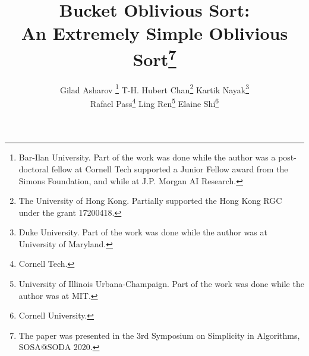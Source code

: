 \documentclass[11pt,letterpaper]{article}
\theoremstyle{boxes}
\begin{document}
\title{\bf Bucket Oblivious Sort: \\An Extremely Simple Oblivious Sort\thanks{The paper was presented in the 3rd Symposium on Simplicity in Algorithms, SOSA@SODA 2020.}}

\author{Gilad Asharov \thanks{Bar-Ilan University. Part of the work was done while the author was a post-doctoral fellow at Cornell Tech supported a Junior Fellow award from the Simons Foundation, and while at J.P. Morgan AI Research.} \qquad
T-H. Hubert Chan\thanks{The University of Hong Kong. Partially supported the Hong Kong RGC under the grant 17200418.} \qquad
Kartik Nayak\thanks{Duke University. Part of the work was done while the author was at University of Maryland.} \\
Rafael Pass\thanks{Cornell Tech.} \qquad
Ling Ren\thanks{University of Illinois Urbana-Champaign. Part of the work was done while the author was at MIT.} \qquad
Elaine Shi\thanks{Cornell University.}}

\newcommand{\rl}[1]{{\footnotesize\color{orange}[Ling: #1]}}

\date{}

\maketitle


\begin{abstract}

\end{abstract}










\appendix

%
\end{document}
